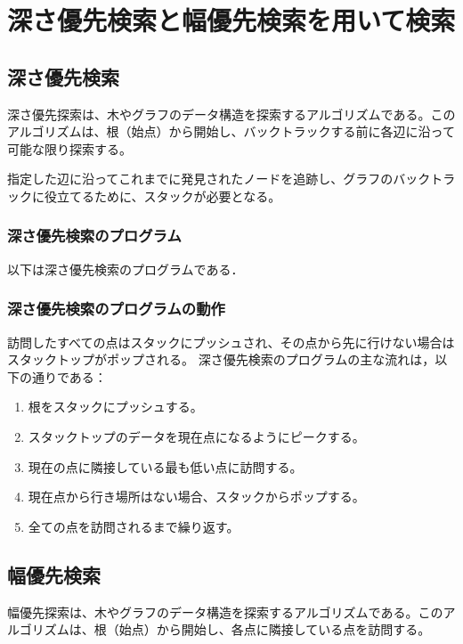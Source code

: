 \documentclass[a4j, titlepage]{jarticle}
\begin{document}
\section{深さ優先検索と幅優先検索を用いて検索}
    \subsection{深さ優先検索}
    深さ優先探索は、木やグラフのデータ構造を探索するアルゴリズムである。このアルゴリズムは、根（始点）から開始し、バックトラックする前に各辺に沿って可能な限り探索する。

    指定した辺に沿ってこれまでに発見されたノードを追跡し、グラフのバックトラックに役立てるために、スタックが必要となる。

        \subsubsection{深さ優先検索のプログラム}
        以下は深さ優先検索のプログラムである．
        
        \subsubsection{深さ優先検索のプログラムの動作}
        訪問したすべての点はスタックにプッシュされ、その点から先に行けない場合はスタックトップがポップされる。
        深さ優先検索のプログラムの主な流れは，以下の通りである：
        \begin{screen}
            \begin{enumerate}
                \item 根をスタックにプッシュする。
                \item スタックトップのデータを現在点になるようにピークする。
                \item 現在の点に隣接している最も低い点に訪問する。
                \item 現在点から行き場所はない場合、スタックからポップする。
                \item 全ての点を訪問されるまで繰り返す。
            \end{enumerate}
        \end{screen}
        
    \subsection{幅優先検索}
    幅優先探索は、木やグラフのデータ構造を探索するアルゴリズムである。このアルゴリズムは、根（始点）から開始し、各点に隣接している点を訪問する。
\end{document}
